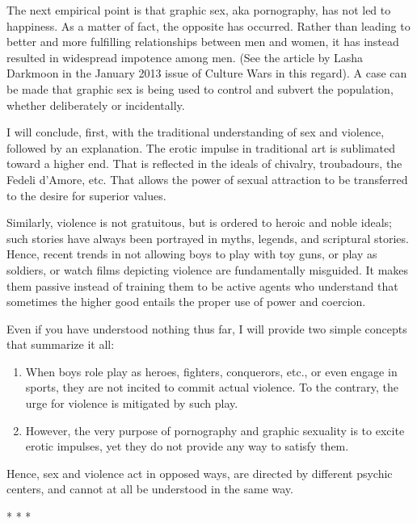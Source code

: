 The next empirical point is that graphic sex, aka pornography, has not led to happiness. As a matter of fact, the opposite has occurred. Rather than leading to better and more fulfilling relationships between men and women, it has instead resulted in widespread impotence among men. (See the article by Lasha Darkmoon in the January 2013 issue of Culture Wars in this regard). A case can be made that graphic sex is being used to control and subvert the population, whether deliberately or incidentally.

I will conclude, first, with the traditional understanding of sex and violence, followed by an explanation. The erotic impulse in traditional art is sublimated toward a higher end. That is reflected in the ideals of chivalry, troubadours, the Fedeli d'Amore, etc. That allows the power of sexual attraction to be transferred to the desire for superior values.

Similarly, violence is not gratuitous, but is ordered to heroic and noble ideals; such stories have always been portrayed in myths, legends, and scriptural stories. Hence, recent trends in not allowing boys to play with toy guns, or play as soldiers, or watch films depicting violence are fundamentally misguided. It makes them passive instead of training them to be active agents who understand that sometimes the higher good entails the proper use of power and coercion.

Even if you have understood nothing thus far, I will provide two simple concepts that summarize it all:

\begin{enumerate}
\item When boys role play as heroes, fighters, conquerors, etc., or even engage in sports, they are not incited to commit actual violence. To the contrary, the urge for violence is mitigated by such play. 
\item However, the very purpose of pornography and graphic sexuality is to excite erotic impulses, yet they do not provide any way to satisfy them. 
\end{enumerate}
Hence, sex and violence act in opposed ways, are directed by different psychic centers, and cannot at all be understood in the same way.




\begin{center}* * *\end{center}

